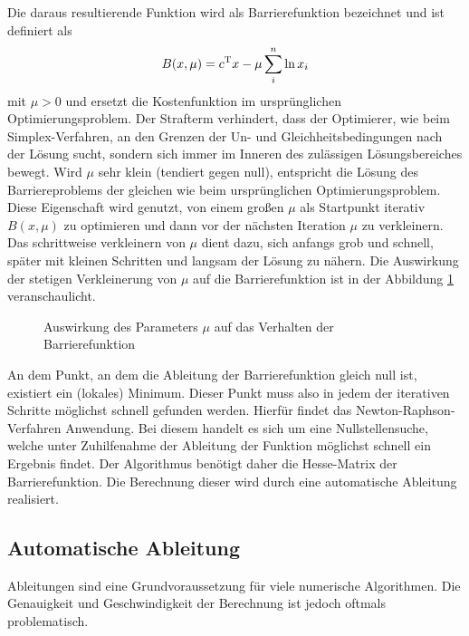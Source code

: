 \documentclass{like}
\begin{document}
Die daraus resultierende Funktion wird als Barrierefunktion bezeichnet und ist definiert als \\
\begin{equation}
	B(x,\mu) =  c\textsuperscript{T}x - \mu \sum_{i}^{n} \ln x_i
\end{equation}
mit $\mu > 0$ und ersetzt die Kostenfunktion im ursprünglichen Optimierungsproblem. Der Strafterm verhindert, dass der Optimierer, wie beim Simplex-Verfahren, an den Grenzen der Un- und Gleichheitsbedingungen nach der Lösung sucht, sondern sich immer im Inneren des zulässigen Lösungsbereiches bewegt. Wird \(\mu\) sehr klein (tendiert gegen null), entspricht die Lösung des Barriereproblems der gleichen wie beim ursprünglichen Optimierungsproblem. Diese Eigenschaft wird genutzt, von einem großen \(\mu\) als Startpunkt iterativ $B(x,\mu)$ zu optimieren und dann vor der nächsten Iteration \(\mu\) zu verkleinern. Das schrittweise verkleinern von $\mu$ dient dazu, sich anfangs grob und schnell, später mit kleinen Schritten und langsam der Lösung zu nähern. Die Auswirkung der stetigen Verkleinerung von \(\mu\) auf die Barrierefunktion ist in der Abbildung \ref{fig:iterPointLn} veranschaulicht.

\begin{figure}[ht!]
	\centering
	 
	\caption{Auswirkung des Parameters $\mu$ auf das Verhalten der Barrierefunktion}
	\label{fig:iterPointLn}
\end{figure}

An dem Punkt, an dem die Ableitung der Barrierefunktion gleich null ist, existiert ein (lokales) Minimum. Dieser Punkt muss also in jedem der iterativen Schritte möglichst schnell gefunden werden. Hierfür findet das Newton-Raphson-Verfahren Anwendung. Bei diesem handelt es sich um eine Nullstellensuche, welche unter Zuhilfenahme der Ableitung der Funktion möglichst schnell ein Ergebnis findet. Der Algorithmus benötigt daher die Hesse-Matrix der Barrierefunktion. Die Berechnung dieser wird durch eine automatische Ableitung realisiert.

\subsection{Automatische Ableitung} 

Ableitungen sind eine Grundvoraussetzung für viele numerische Algorithmen. Die Genau\-ig\-keit und Geschwindigkeit der Berechnung ist jedoch oftmals problematisch.
\end{document}

